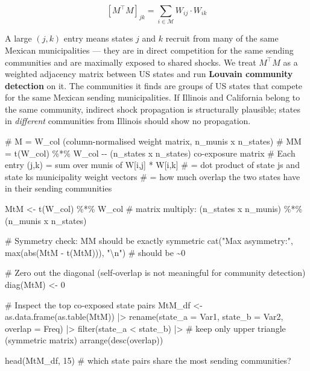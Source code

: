 \documentclass[
  11pt,
  letterpaper,
  DIV=11,
  numbers=noendperiod]{scrartcl}
\newenvironment{Shaded}{}{}
\newcommand{\AttributeTok}[1]{\textcolor[rgb]{0.84,0.23,0.29}{#1}}
\newcommand{\CommentTok}[1]{\textcolor[rgb]{0.42,0.45,0.49}{#1}}
\newcommand{\DecValTok}[1]{\textcolor[rgb]{0.00,0.36,0.77}{#1}}
\newcommand{\FunctionTok}[1]{\textcolor[rgb]{0.44,0.26,0.76}{#1}}
\newcommand{\NormalTok}[1]{\textcolor[rgb]{0.14,0.16,0.18}{#1}}
\newcommand{\OtherTok}[1]{\textcolor[rgb]{0.44,0.26,0.76}{#1}}
\newcommand{\SpecialCharTok}[1]{\textcolor[rgb]{0.00,0.36,0.77}{#1}}
\newcommand{\StringTok}[1]{\textcolor[rgb]{0.01,0.18,0.38}{#1}}
\begin{document}
\[[M^\top M]_{jk} = \sum_{i \in \mathcal{M}} W_{ij} \cdot W_{ik}\]

A large \((j,k)\) entry means states \(j\) and \(k\) recruit from many
of the same Mexican municipalities --- they are in direct competition
for the same sending communities and are maximally exposed to shared
shocks. We treat \(M^\top M\) as a weighted adjacency matrix between US
states and run \textbf{Louvain community detection} on it. The
communities it finds are groups of US states that compete for the same
Mexican sending municipalities. If Illinois and California belong to the
same community, indirect shock propagation is structurally plausible;
states in \emph{different} communities from Illinois should show no
propagation.

\begin{Shaded}
\begin{Highlighting}[]
\CommentTok{\# M = W\_col (column{-}normalised weight matrix, n\_munis x n\_states)}
\CommentTok{\# M\textquotesingle{}M = t(W\_col) \%*\% W\_col {-}{-} (n\_states x n\_states) co{-}exposure matrix}
\CommentTok{\# Each entry (j,k) = sum over munis of W[i,j] * W[i,k]}
\CommentTok{\# = dot product of state j\textquotesingle{}s and state k\textquotesingle{}s municipality weight vectors}
\CommentTok{\# = how much overlap the two states have in their sending communities}

\NormalTok{MtM }\OtherTok{\textless{}{-}} \FunctionTok{t}\NormalTok{(W\_col) }\SpecialCharTok{\%*\%}\NormalTok{ W\_col   }\CommentTok{\# matrix multiply: (n\_states x n\_munis) \%*\% (n\_munis x n\_states)}

\CommentTok{\# Symmetry check: M\textquotesingle{}M should be exactly symmetric}
\FunctionTok{cat}\NormalTok{(}\StringTok{"Max asymmetry:"}\NormalTok{, }\FunctionTok{max}\NormalTok{(}\FunctionTok{abs}\NormalTok{(MtM }\SpecialCharTok{{-}} \FunctionTok{t}\NormalTok{(MtM))), }\StringTok{"}\SpecialCharTok{\textbackslash{}n}\StringTok{"}\NormalTok{)  }\CommentTok{\# should be \textasciitilde{}0}

\CommentTok{\# Zero out the diagonal (self{-}overlap is not meaningful for community detection)}
\FunctionTok{diag}\NormalTok{(MtM) }\OtherTok{\textless{}{-}} \DecValTok{0}

\CommentTok{\# Inspect the top co{-}exposed state pairs}
\NormalTok{MtM\_df }\OtherTok{\textless{}{-}} \FunctionTok{as.data.frame}\NormalTok{(}\FunctionTok{as.table}\NormalTok{(MtM)) }\SpecialCharTok{|\textgreater{}}
  \FunctionTok{rename}\NormalTok{(}\AttributeTok{state\_a =}\NormalTok{ Var1, }\AttributeTok{state\_b =}\NormalTok{ Var2, }\AttributeTok{overlap =}\NormalTok{ Freq) }\SpecialCharTok{|\textgreater{}}
  \FunctionTok{filter}\NormalTok{(state\_a }\SpecialCharTok{\textless{}}\NormalTok{ state\_b) }\SpecialCharTok{|\textgreater{}}    \CommentTok{\# keep only upper triangle (symmetric matrix)}
  \FunctionTok{arrange}\NormalTok{(}\FunctionTok{desc}\NormalTok{(overlap))}

\FunctionTok{head}\NormalTok{(MtM\_df, }\DecValTok{15}\NormalTok{)   }\CommentTok{\# which state pairs share the most sending communities?}
\end{Highlighting}
\end{Shaded}
\end{document}

